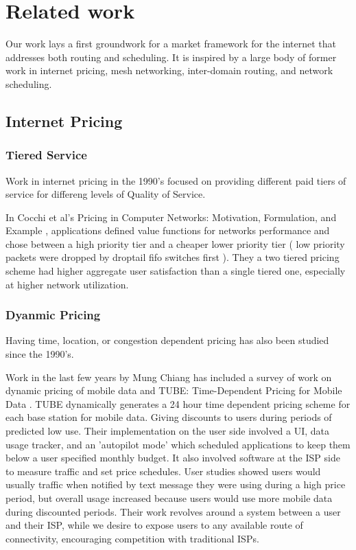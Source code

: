 \label{sec:related}
\section{Related work}
Our work lays a first groundwork for a market framework for the internet that addresses both routing and scheduling. It is inspired by a large body of former work in internet pricing, mesh networking, inter-domain routing, and network scheduling.

\subsection{Internet Pricing}
\subsubsection{Tiered Service}
Work in internet pricing in the 1990's focused on providing different paid tiers of service for differeng levels of Quality of Service.

In Cocchi et al's Pricing in Computer Networks: Motivation, Formulation, and Example \cite{cocchi93}, applications defined value functions for networks performance and chose between a high priority tier and a cheaper lower priority tier ( low priority packets were dropped by droptail fifo switches first ). They a two tiered pricing scheme had higher aggregate user satisfaction than a single tiered one, especially at higher network utilization.

\subsubsection{Dyanmic Pricing}
Having time, location, or congestion dependent pricing has also been studied since the 1990's.


Work in the last few years by Mung Chiang has included a survey of work on dynamic pricing of mobile data \cite{pricingdata13} and TUBE: Time-Dependent Pricing for Mobile Data \cite{tube12}.
TUBE dynamically generates a 24 hour time dependent pricing scheme for each base station for mobile data. Giving discounts to users during periods of predicted low use.
Their implementation on the user side involved a UI, data usage tracker, and an 'autopilot mode' which scheduled applications to keep them below a user specified monthly budget. It also involved software at the ISP side to measure traffic and set price schedules.
User studies showed users would usually traffic when notified by text message they were using during a high price period, but overall usage increased because users would use more mobile data during discounted periods.
Their work revolves around a system between a user and their ISP, while we desire to expose users to any available route of connectivity, encouraging competition with traditional ISPs.

